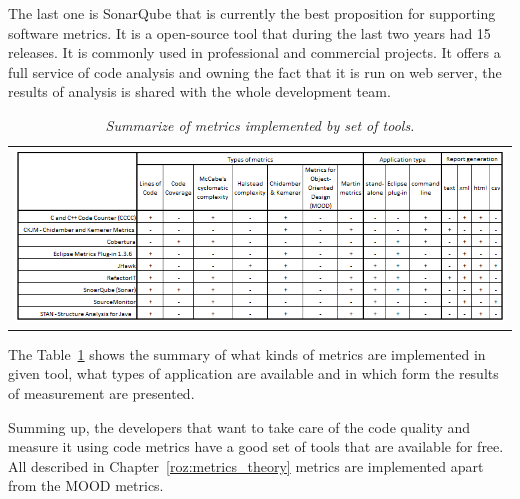 The last one is SonarQube that is currently the best proposition for supporting software metrics. It is a open-source tool that during the last two years had 15 releases. It is commonly used in professional and commercial projects. It offers a full service of code analysis and owning the fact that it is run on web server, the results of analysis is shared with the whole development team.  

\begin{table}[h!]
	\centering
	\begin{tabular}{l}
		\includegraphics[scale=0.7]{img/tools.png} \\
	\end{tabular}	
		\caption{\textit{Summarize of metrics implemented by set of tools.}}
		\label{tab:summarytools}
\end{table}

The Table~\ref{tab:summarytools} shows the summary of what kinds of metrics are implemented in given tool, what types of application are available and in which form the results of measurement are presented.

Summing up, the developers that want to take care of the code quality and measure it using code metrics have a good set of tools that are available for free.  All described in Chapter~\ref{roz:metrics_theory} metrics are implemented apart from the MOOD metrics. 

